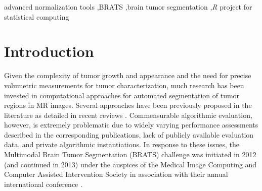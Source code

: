 \documentclass[preprint,authoryear,review,12pt]{elsarticle}
\begin{document}
\begin{frontmatter}
\begin{keyword}
advanced normalization tools \sep BRATS \sep brain tumor segmentation \sep \textit{R} project for statistical computing
\end{keyword}

\end{frontmatter}

%
%
\newpage







%
%
%


%
%

\section{Introduction}
Given the complexity of tumor growth and appearance and the need
for precise volumetric measurements for tumor characterization, 
much research has been invested in computational approaches for 
automated segmentation of tumor regions in MR images.  Several 
approaches have been previously proposed in the literature as
detailed in recent reviews \citep{angelini2007,bauer2013}.  
Commensurable algorithmic evaluation, however, is
extremely problematic due to widely varying performance assessments
described in the corresponding publications, lack of publicly available 
evaluation data, and private algorithmic instantiations.  
In response to these issues, the Multimodal Brain Tumor Segmentation 
(BRATS) challenge was initiated in 2012 (and continued in 2013) under 
the auspices of the Medical Image Computing and Computer Assisted 
Intervention Society in association with their annual international 
conference \citep{menze2014}.
\end{document}
